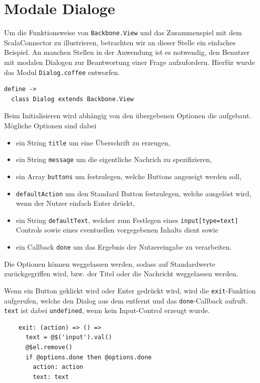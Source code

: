 \section{Modale Dialoge}

Um die Funktionsweise von \texttt{Backbone.View} und das Zusammenspiel mit dem ScalaConnector zu
illustrieren, betrachten wir an dieser Stelle ein einfaches Beispiel. An manchen Stellen in der
Anwendung ist es notwendig, den Benutzer mit modalen Dialogen zur Beantwortung einer Frage
aufzufordern. Hierfür wurde das Modul \texttt{Dialog.coffee} entworfen.

\begin{lstlisting}
define ->
  class Dialog extends Backbone.View
\end{lstlisting}

Beim Initialisieren wird abhängig von den übergebenen Optionen die  aufgebaut. Mögliche
Optionen sind dabei

\begin{itemize}
  \item ein String \texttt{title} um eine Überschrift zu erzeugen,
  \item ein String \texttt{message} um die eigentliche Nachrich zu spezifizieren,
  \item ein Array \texttt{buttons} um festzulegen, welche Buttons angezeigt werden soll,
  \item \texttt{defaultAction} um den Standard Button festzulegen, welche ausgelöst wird, wenn der
  Nutzer einfach Enter drückt,
  \item ein String \texttt{defaultText}, welcher zum Festlegen eines \texttt{input[type=text]} 
  Controls sowie eines eventuellen vorgegebenen Inhalts dient sowie
  \item ein Callback \texttt{done} um das Ergebnis der Nutzereingabe zu verarbeiten.
\end{itemize}

Die Optionen können weggelassen werden, sodass auf Standardwerte zurückgegriffen wird, bzw. der
Titel oder die Nachricht weggelassen werden.

Wenn ein Button geklickt wird oder Enter gedrückt wird, wird die \texttt{exit}-Funktion aufgerufen,
welche den Dialog aus dem  entfernt und das \texttt{done}-Callback aufruft. \texttt{text}
ist dabei \texttt{undefined}, wenn kein Input-Control erzeugt wurde.

\begin{lstlisting}
    exit: (action) => () =>
      text = @$('input').val()
      @$el.remove()
      if @options.done then @options.done
        action: action
        text: text
\end{lstlisting}

